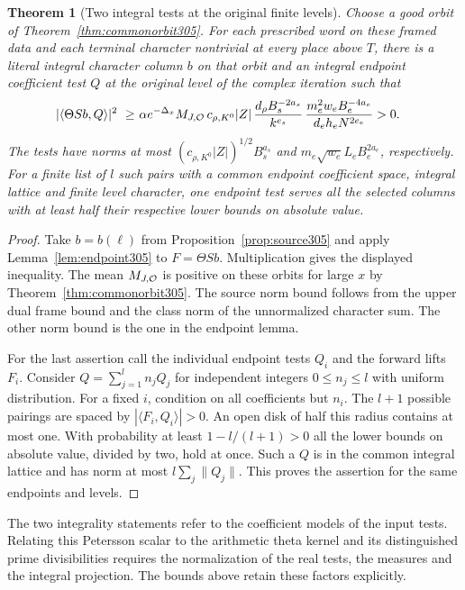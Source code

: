 \documentclass[a4paper,11pt]{article}
\newtheorem{theorem}[proposition]{Theorem}
\theoremstyle{definition}
\theoremstyle{remark}
\numberwithin{equation}{section}
\begin{document}
\begin{theorem}[Two integral tests at the original finite levels]\leavevmode
\label{thm:pair305}
Choose a good orbit of Theorem~\ref{thm:commonorbit305}.
For each prescribed word on these framed data and each
terminal character nontrivial at every place above \(T\), there is a
literal integral character column \(b\) on that orbit and
an integral endpoint coefficient test \(Q\) at the original
level of the complex iteration such that
\[
\begin{split}
 |\langle\Theta S b,Q\rangle|^2 \ \ge\ &
     \alpha e^{-\Delta_x} M_{J,{\cal O}}\,
     c_{\rho,K^0}|Z|\,
        \frac{d_\rho B_s^{-2a_s}}{k^{e_s}}\,
        \frac{m_e^2 w_e B_e^{-4a_e}}{d_e h_e N^{2e_e}}>0 .
\end{split}
\]
The tests have norms at most
\((c_{\rho,K^0}|Z|)^{1/2}B_s^{a_s}\) and
\(m_e\sqrt{w_e}L_eB_e^{2a_e}\), respectively.
For a finite list of \(l\) such pairs with a common endpoint
coefficient space, integral lattice and finite level
character, one endpoint test serves all the selected
columns with at least half their respective lower bounds
on absolute value.
\end{theorem}
\begin{proof}
Take \(b=b(\ell)\) from Proposition~\ref{prop:source305}
and apply Lemma~\ref{lem:endpoint305} to \(F=\Theta S b\).
Multiplication gives the displayed inequality. The mean
\(M_{J,{\cal O}}\) is positive on these orbits for large
\(x\) by Theorem~\ref{thm:commonorbit305}. The source
norm bound follows from the upper dual frame bound and
the class norm of the unnormalized character sum. The
other norm bound is the one in the endpoint lemma.

For the last assertion call the individual endpoint tests
\(Q_i\) and the forward lifts \(F_i\). Consider
\(Q=\sum_{j=1}^l n_j Q_j\) for independent integers
\(0\le n_j\le l\) with uniform distribution. For a fixed
\(i\), condition on all coefficients but \(n_i\).
The \(l+1\) possible pairings are spaced by
\(|\langle F_i,Q_i\rangle|>0\). An open disk of half
this radius contains at most one. With probability at
least \(1-l/(l+1)>0\) all the lower bounds on absolute
value, divided by two, hold at once. Such a \(Q\) is
in the common integral lattice and has norm at most
\(l\sum_j\|Q_j\|\). This proves the assertion for the
same endpoints and levels.
\end{proof}

The two integrality statements refer to the coefficient
models of the input tests. Relating this Petersson scalar
to the arithmetic theta kernel and its distinguished
prime divisibilities requires the normalization of the
real tests, the measures and the integral projection.
The bounds above retain these factors explicitly.
\end{document}
